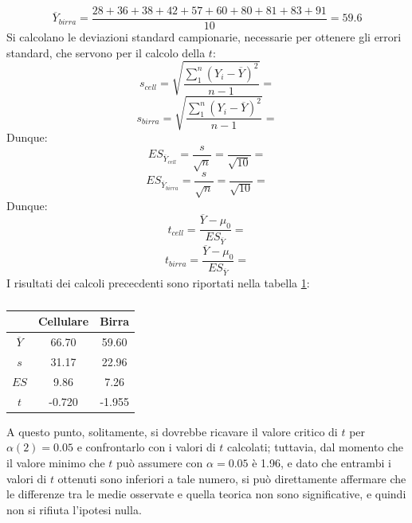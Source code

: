 \documentclass[10pt, draft]{book}
\newcounter{example}[section]
\begin{document}
\begin{example}
\begin{equation}
        \overline{Y}_{birra} = \frac{28+36+38+42+57+60+80+81+83+91}{10} = 59.6
    \end{equation}
    Si calcolano le deviazioni standard campionarie, necessarie per ottenere gli errori standard, che servono per il calcolo della $t$:
    \begin{equation}
        s_{cell} = \sqrt{\frac{\sum\limits_1^n{(Y_i - \overline{Y})^2}}{n-1}} = 
    \end{equation}
    \begin{equation}
        s_{birra} = \sqrt{\frac{\sum\limits_1^n{(Y_i - \overline{Y})^2}}{n-1}} = 
    \end{equation}
    Dunque:
    \begin{equation}
        ES_{\overline{Y}_{cell}} = \frac{s}{\sqrt{n}} = \frac{}{\sqrt{10}} = 
    \end{equation}
    \begin{equation}
        ES_{\overline{Y}_{birra}} = \frac{s}{\sqrt{n}} = \frac{}{\sqrt{10}} = 
    \end{equation}
    Dunque:
    \begin{equation}
        t_{cell} = \frac{\overline{Y}-\mu_0}{ES_{\overline{Y}}} = 
    \end{equation}
    \begin{equation}
        t_{birra} = \frac{\overline{Y}-\mu_0}{ES_{\overline{Y}}} = 
    \end{equation}
    I risultati dei calcoli prececdenti sono riportati nella tabella \ref{tabguida2}:
    \begin{table}[H]
        \centering
        \renewcommand\arraystretch{1.2}
        \begin{tabular}{c|c|c}
        \hline
        & \textbf{Cellulare} & \textbf{Birra}\\
        \hline
        \textbf{$\overline{Y}$} & 66.70 & 59.60\\
        \hline
        \textbf{$s$} & 31.17 & 22.96\\
        \hline
        \textbf{$ES$} & 9.86 & 7.26\\
        \hline
        \textbf{$t$} & -0.720 & -1.955\\
        \hline
        \end{tabular}
        \caption{\small{}}
        \label{tabguida2}
    \end{table}\noindent
    A questo punto, solitamente, si dovrebbe ricavare il valore critico di $t$ per $\alpha(2) = 0.05$ e confrontarlo con i valori di $t$ calcolati; tuttavia, dal momento che il valore minimo che $t$ può assumere con $\alpha = 0.05$ è 1.96, e dato che entrambi i valori di $t$ ottenuti sono inferiori a tale numero, si può direttamente affermare che le differenze tra le medie osservate e quella teorica non sono significative, e quindi non si rifiuta l'ipotesi nulla.

\end{example}
\end{document}
